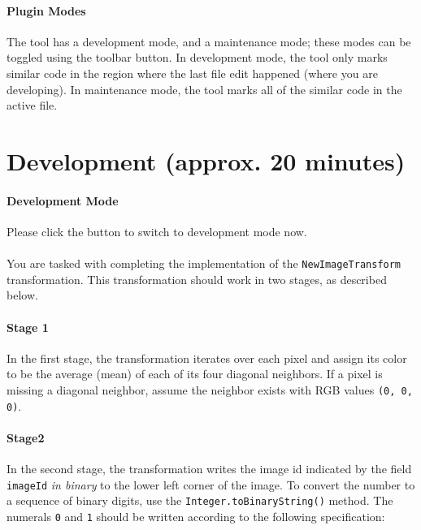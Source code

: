 \documentclass[12pt]{article}
\begin{document}
\paragraph{Plugin Modes}
The tool has a development mode, and a maintenance mode; these modes
can be toggled using the toolbar button. In development mode, the tool only
marks similar code in the region where the last file edit happened
(where you are developing). In maintenance mode, the tool marks all of
the similar code in the active file.

\pagebreak

\section{Development (approx. 20 minutes)}

\paragraph{Development Mode}
Please click the button to switch to development mode now.

\paragraph{}
You are tasked with completing the implementation of the
\verb|NewImageTransform| transformation.  This transformation should
work in two stages, as described below.

\paragraph{Stage 1}
In the first stage, the transformation iterates over each
pixel and assign its color to be the average (mean) of each of its
four diagonal neighbors. If a pixel is missing a diagonal neighbor,
assume the neighbor exists with RGB values \verb|(0, 0, 0)|.

\paragraph{Stage2}
In the second stage, the transformation
writes the image id indicated by the field \verb|imageId| \textit{in binary} to the lower
left corner of the image.  To convert the number to a sequence of binary digits, use the 
\verb|Integer.toBinaryString()| method. The numerals \verb|0|
and \verb|1| should be written according to the following specification:
\end{document}
